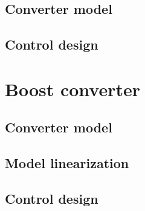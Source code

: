 \documentclass{article}
\begin{document}
\subsection{Converter model}
\subsection{Control design}

\section{Boost converter}
\subsection{Converter model}
\subsection{Model linearization}
\subsection{Control design}
\end{document}
